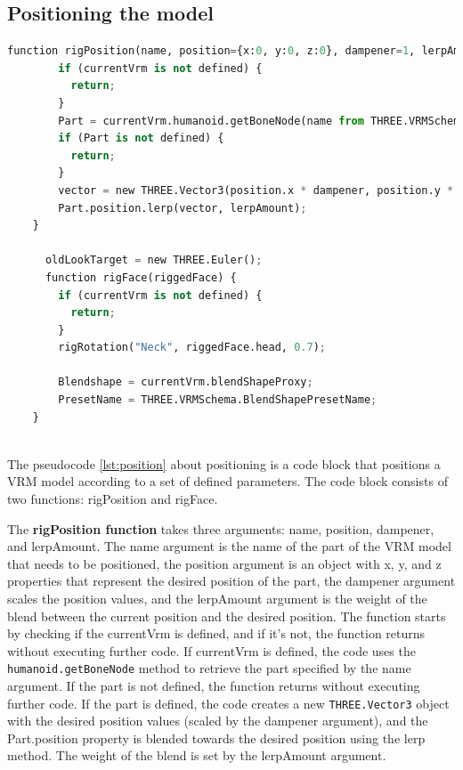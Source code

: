 \subsection{Positioning the model}

\begin{lstlisting}[language=Python,caption=Position of the model,label=lst:position]
    function rigPosition(name, position={x:0, y:0, z:0}, dampener=1, lerpAmount=0.3) {
        if (currentVrm is not defined) {
          return;
        }
        Part = currentVrm.humanoid.getBoneNode(name from THREE.VRMSchema.HumanoidBoneName);
        if (Part is not defined) {
          return;
        }
        vector = new THREE.Vector3(position.x * dampener, position.y * dampener, position.z * dampener);
        Part.position.lerp(vector, lerpAmount);
    }
      
      oldLookTarget = new THREE.Euler();
      function rigFace(riggedFace) {
        if (currentVrm is not defined) {
          return;
        }
        rigRotation("Neck", riggedFace.head, 0.7);
      
        Blendshape = currentVrm.blendShapeProxy;
        PresetName = THREE.VRMSchema.BlendShapePresetName;
    }
      

\end{lstlisting}
The pseudocode \ref{lst:position} about positioning is a code block that positions a VRM model according to a set of defined parameters. 
The code block consists of two functions: rigPosition and rigFace.

The \textbf{rigPosition function} takes three arguments: name, position, dampener, and lerpAmount. The name argument is the name 
of the part of the VRM model that needs to be positioned, the position argument is an object with x, y, and z properties 
that represent the desired position of the part, the dampener argument scales the position values, and the lerpAmount 
argument is the weight of the blend between the current position and the desired position.
The function starts by checking if the currentVrm is defined, and if it's not, the function returns without executing further code. 
If currentVrm is defined, the code uses the \texttt{humanoid.getBoneNode} method to retrieve the part specified by the name argument. 
If the part is not defined, the function returns without executing further code.
If the part is defined, the code creates a new \texttt{THREE.Vector3} object with the desired position 
values (scaled by the dampener argument), and the Part.position property is blended towards the 
desired position using the lerp method. The weight of the blend is set by the lerpAmount argument.

